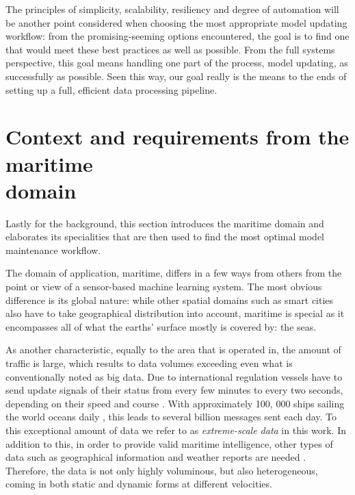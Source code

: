 The principles of simplicity, scalability, resiliency and degree of automation will be another point considered when choosing the most appropriate model updating workflow: from the promising-seeming options encountered, the goal is to find one that would meet these best practices as well as possible. From the full systems perspective, this goal means handling one part of the process, model updating, as successfully as possible. Seen this way, our goal really is the means to the ends of setting up a full, efficient data processing pipeline.

\section[Context and requirements from the maritime domain]{Context and requirements from the maritime\\ domain}

Lastly for the background, this section introduces the maritime domain and elaborates its specialities that are then used to find the most optimal model maintenance workflow.

The domain of application, maritime, differs in a few ways from others from the point or view of a sensor-based machine learning system. The most obvious difference is its global nature: while other spatial domains such as smart cities also have to take geographical distribution into account, maritime is special as it encompasses all of what the earths' surface mostly is covered by: the seas. 

As another characteristic, equally to the area that is operated in, the amount of traffic is large, which results to data volumes exceeding even what is conventionally noted as big data. Due to international regulation vessels have to send update signals of their status from every few minutes to every two seconds, depending on their speed and course \cite{maritimeinformatics}. With approximately 100, 000 ships sailing the world oceans daily \cite{maritimeinformatics}, this leads to several billion messages sent each day. To this exceptional amount of data we refer to as \textit{extreme-scale data} in this work. In addition to this, in order to provide valid maritime intelligence, other types of data such as geographical information and weather reports are needed \cite{D1.1}. Therefore, the data is not only highly voluminous, but also heterogeneous, coming in both static and dynamic forms at different velocities.

